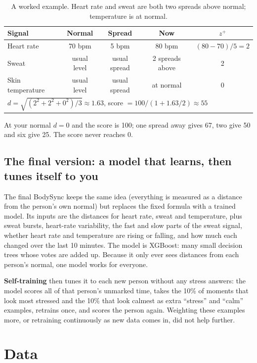 \documentclass{article}
\begin{document}
\begin{table}[H]
\centering\small
\caption{A worked example. Heart rate and sweat are both two spreads above normal; temperature is at normal.}
\begin{tabular}{lcccc}
\toprule
Signal & Normal & Spread & Now & $z^+$ \\
\midrule
Heart rate & 70 bpm & 5 bpm & 80 bpm & $(80-70)/5 = 2$ \\
Sweat & usual level & usual spread & 2 spreads above & 2 \\
Skin temperature & usual level & usual spread & at normal & 0 \\
\midrule
\multicolumn{5}{l}{$d = \sqrt{(2^2 + 2^2 + 0^2)/3} \approx 1.63$, \quad score $= 100/(1 + 1.63/2) \approx 55$} \\
\bottomrule
\end{tabular}
\end{table}

At your normal $d = 0$ and the score is 100; one spread away gives 67, two give 50 and six give 25. The score never reaches 0.

\subsection*{The final version: a model that learns, then tunes itself to you}

The final BodySync keeps the same idea (everything is measured as a distance from the person's own normal) but replaces the fixed formula with a trained model. Its inputs are the distances for heart rate, sweat and temperature, plus sweat bursts, heart-rate variability, the fast and slow parts of the sweat signal, whether heart rate and temperature are rising or falling, and how much each changed over the last 10 minutes. The model is XGBoost: many small decision trees whose votes are added up. Because it only ever sees distances from each person's normal, one model works for everyone.

\textbf{Self-training} then tunes it to each new person without any stress answers: the model scores all of that person's unmarked time, takes the 10\% of moments that look most stressed and the 10\% that look calmest as extra ``stress'' and ``calm'' examples, retrains once, and scores the person again. Weighting these examples more, or retraining continuously as new data comes in, did not help further.

\section{Data}
\end{document}
